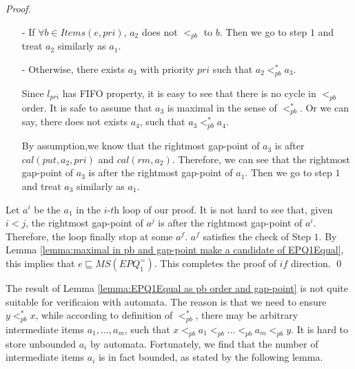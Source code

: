 \begin {proof}
\begin{itemize}
    \begin{itemize}
    \setlength{\itemsep}{0.5pt}
    \item[-] If $\forall b \in \textit{Items}(e,\textit{pri})$, $a_2$ does not $<_{\textit{pb}}$ to $b$. Then we go to step $1$ and treat $a_2$ similarly as $a_1$.
    \item[-] Otherwise, there exists $a_3$ with priority $\textit{pri}$ such that $a_2 <_{\textit{pb}}^* a_3$.

    Since $l_{\textit{pri}}$ has FIFO property, it is easy to see that there is no cycle in $<_{\textit{pb}}$ order. It is safe to assume that $a_3$ is maximal in the sense of $<_{\textit{pb}}^*$. Or we can say, there does not exists $a_4$, such that $a_3 <_{\textit{pb}}^* a_4$.

    By assumption,we know that the rightmost gap-point of $a_3$ is after $\textit{cal}(\textit{put},a_2,\textit{pri})$ and $\textit{cal}(\textit{rm},a_2)$. Therefore, we can see that the rightmost gap-point of $a_3$ is after the rightmost gap-point of $a_1$. Then we go to step $1$ and treat $a_3$ similarly as $a_1$.
    \end{itemize}
\end{itemize}

Let $a^i$ be the $a_1$ in the $\textit{i-th}$ loop of our proof. It is not hard to see that, given $i<j$, the rightmost gap-point of $a^j$ is after the rightmost gap-point of $a^i$. Therefore, the loop finally stop at some $a^f$. $a^f$ satisfies the check of Step $1$. By Lemma \ref{lemma:maximal in pb and gap-point make a candidate of EPQ1Equal}, this implies that $e \sqsubseteq \textit{MS}(\textit{EPQ}_1^{=})$. This completes the proof of $\textit{if}$ direction. \qed
\end {proof}

The result of Lemma \ref{lemma:EPQ1Equal as pb order and gap-point} is not quite suitable for verificaion with automata. The reason is that we need to ensure $y <_{\textit{pb}}^* x$, while according to definition of $<_{\textit{pb}}^*$, there may be arbitrary intermediate items $a_1,\ldots,a_m$, such that $x <_{\textit{pb}} a_1 <_{\textit{pb}} \ldots <_{\textit{pb}} a_m <_{\textit{pb}} y$. It is hard to store unbounded $a_i$ by automata. Fortunately, we find that the number of intermediate items $a_i$ is in fact bounded, as stated by the following lemma.


